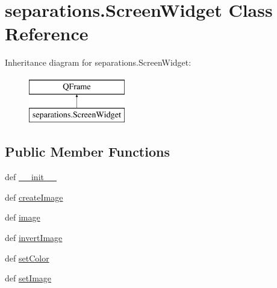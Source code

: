 \hypertarget{classseparations_1_1ScreenWidget}{}\section{separations.\+Screen\+Widget Class Reference}
\label{classseparations_1_1ScreenWidget}
Inheritance diagram for separations.\+Screen\+Widget\+:\begin{figure}[H]
\begin{center}
\leavevmode
\includegraphics[height=2.000000cm]{classseparations_1_1ScreenWidget}
\end{center}
\end{figure}
\subsection*{Public Member Functions}
\begin{DoxyCompactItemize}
\item 
def \hyperlink{classseparations_1_1ScreenWidget_a58e8a47508966565f38605fa4cb1742c}{\+\_\+\+\_\+init\+\_\+\+\_\+}
\item 
def \hyperlink{classseparations_1_1ScreenWidget_a055cd08285bb530d7dfd62c0612b8f53}{create\+Image}
\item 
def \hyperlink{classseparations_1_1ScreenWidget_ade184ab0487747ad82e6909a6ab12fe7}{image}
\item 
def \hyperlink{classseparations_1_1ScreenWidget_a15a38e7cc4867cd6f0e50e6546418c72}{invert\+Image}
\item 
def \hyperlink{classseparations_1_1ScreenWidget_ad2ba2aa2500af7f35df3f22bcffd6616}{set\+Color}
\item 
def \hyperlink{classseparations_1_1ScreenWidget_a36945a641fabfc4fb1b80c38ff180b8d}{set\+Image}
\end{DoxyCompactItemize}
